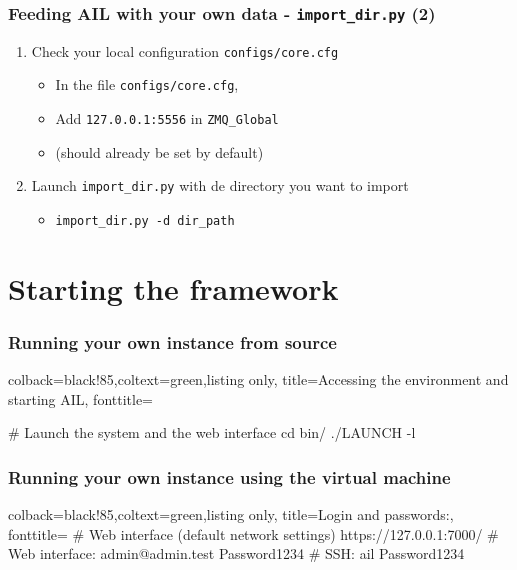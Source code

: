 \documentclass{beamer}
\begin{document}
\begin{frame}
    \frametitle{Feeding AIL with your own data - \texttt{import\_dir.py} (2)}
    \begin{enumerate}
        \item Check your local configuration \texttt{\large{configs/core.cfg}}
            \begin{itemize}
                \item In the file \texttt{\large{configs/core.cfg}},
                \item Add \texttt{127.0.0.1:5556} in \texttt{ZMQ\_Global}
                \item (should already be set by default)
            \end{itemize}
        \item Launch \texttt{import\_dir.py} with de directory you want to import
            \begin{itemize}
                \item \texttt{import\_dir.py -d dir\_path}
            \end{itemize}
    \end{enumerate}
\end{frame}

\section{Starting the framework}
\lstset{style=bash}
\begin{frame}[fragile]
    \frametitle{Running your own instance from source}
    \begin{tcblisting}{colback=black!85,coltext=green,listing only,
        title=Accessing the environment and starting AIL, fonttitle=\bfseries}

# Launch the system and the web interface
cd bin/
./LAUNCH -l

\end{tcblisting}
\end{frame}

\begin{frame}[fragile]
    \frametitle{Running your own instance using the virtual machine}
    \begin{tcblisting}{colback=black!85,coltext=green,listing only,
        title=Login and passwords:, fonttitle=\bfseries}
# Web interface (default network settings)
    https://127.0.0.1:7000/
# Web interface:
    admin@admin.test
    Password1234
# SSH:
    ail
    Password1234
\end{tcblisting}

\end{frame}
\end{document}
